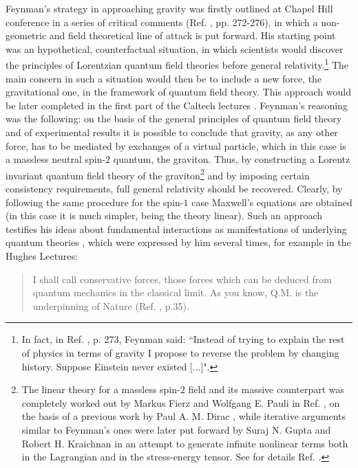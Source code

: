 \documentclass{ws-procs961x669}            %
\begin{document}
Feynman's strategy in approaching gravity was firstly outlined at
Chapel Hill conference in a series of critical comments (Ref.
, pp. 272-276), in which a non-geometric and
field theoretical line of attack is put forward. His starting
point was an hypothetical, counterfactual situation, in which
scientists would discover the principles of Lorentzian quantum
field theories before general relativity.\footnote{In fact, in
Ref. , p. 273, Feynman said: ``Instead of
trying to explain the rest of physics in terms of gravity I
propose to reverse the problem by changing history. Suppose
Einstein never existed [...]".} The main concern in such a
situation would then be to include a new force, the gravitational
one, in the framework of quantum field theory. This approach would
be later completed in the first part of the Caltech lectures
\cite{Feynman:1996kb}. Feynman's reasoning was the following: on
the basis of the general principles of quantum field theory and of
experimental results it is possible to conclude that gravity, as
any other force, has to be mediated by exchanges of a virtual
particle, which in this case is a massless neutral spin-$2$
quantum, the graviton. Thus, by constructing a Lorentz invariant
quantum field theory of the graviton\footnote{The linear theory
for a massless spin-$2$ field and its massive counterpart was
completely worked out by Markus Fierz and Wolfgang E. Pauli in
Ref. , on the basis of a previous work by
Paul A. M. Dirac \cite{Dirac:1936tg}, while iterative arguments
similar to Feynman's ones were later put forward by Suraj N. Gupta
\cite{Gupta:1954zz} and Robert H. Kraichnan
\cite{Kraichnan:1955zz} in an attempt to generate infinite
nonlinear terms both in the Lagrangian and in the stress-energy
tensor. See for details Ref. .} and by
imposing certain consistency requirements, full general relativity
should be recovered. Clearly, by following the same procedure for
the spin-$1$ case Maxwell's equations are obtained (in this case
it is much simpler, being the theory linear). Such an approach testifies his
ideas about fundamental interactions as manifestations of
underlying quantum theories \cite{DiMauro:2020bpd}, which were
expressed by him several times, for example in the Hughes
Lectures\cite{FeynmanHughes2}:
%
\begin{quote}
I shall call conservative forces, those forces which can be
deduced from quantum mechanics in the classical limit. As you
know, Q.M. is the underpinning of Nature (Ref.
, p.35).
\end{quote}
\end{document}
